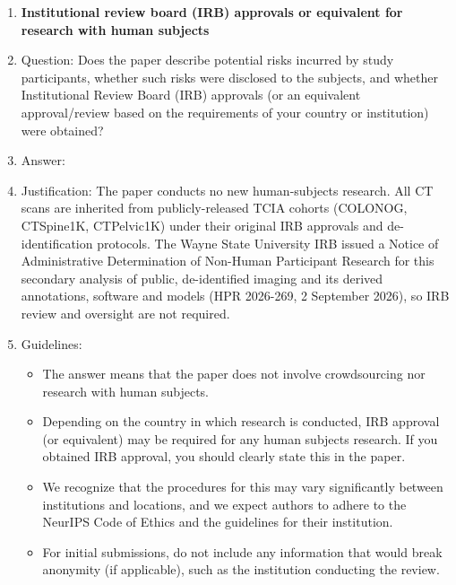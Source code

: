 \begin{enumerate}
\item {\bf Institutional review board (IRB) approvals or equivalent for research with human subjects}
    \item[] Question: Does the paper describe potential risks incurred by study participants, whether such risks were disclosed to the subjects, and whether Institutional Review Board (IRB) approvals (or an equivalent approval/review based on the requirements of your country or institution) were obtained?
    \item[] Answer: \answerNA{}
    \item[] Justification: The paper conducts no new human-subjects research. All CT scans are inherited from publicly-released TCIA cohorts (COLONOG, CTSpine1K, CTPelvic1K) under their original IRB approvals and de-identification protocols. The Wayne State University IRB issued a Notice of Administrative Determination of Non-Human Participant Research for this secondary analysis of public, de-identified imaging and its derived annotations, software and models (HPR 2026-269, 2 September 2026), so IRB review and oversight are not required.
    \item[] Guidelines:
    \begin{itemize}
        \item The answer \answerNA{} means that the paper does not involve crowdsourcing nor research with human subjects.
        \item Depending on the country in which research is conducted, IRB approval (or equivalent) may be required for any human subjects research. If you obtained IRB approval, you should clearly state this in the paper.
        \item We recognize that the procedures for this may vary significantly between institutions and locations, and we expect authors to adhere to the NeurIPS Code of Ethics and the guidelines for their institution.
        \item For initial submissions, do not include any information that would break anonymity (if applicable), such as the institution conducting the review.
    \end{itemize}


\end{enumerate}
